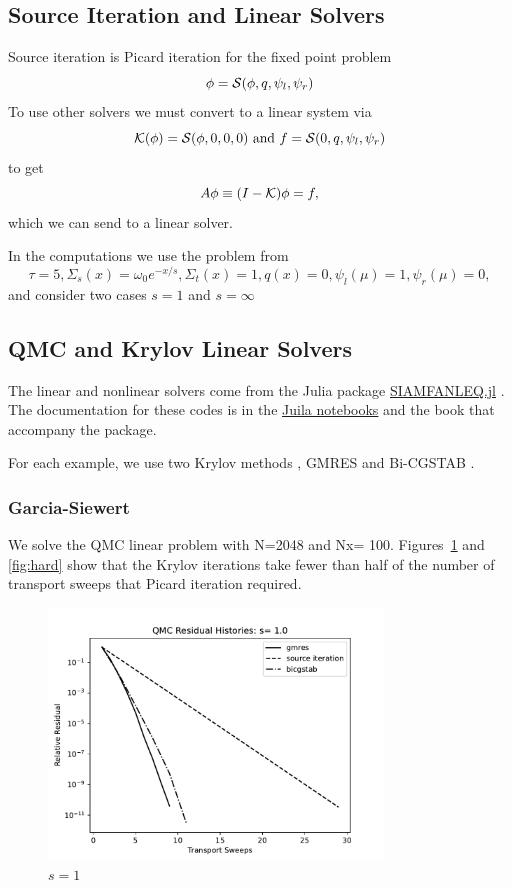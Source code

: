 \subsection{Source Iteration and Linear Solvers}
\label{subsec:source}

Source iteration is Picard iteration for the fixed point problem
\[
\phi = {\cal S}(\phi, q, \psi_l, \psi_r)
\]
To use other solvers we must convert to a linear system via
\[
{\cal K}(\phi) = {\cal S}(\phi, 0, 0, 0) \mbox{ and }
f = {\cal S}(0, q, \psi_l, \psi_r)
\]
to get
\[
A \phi \equiv (I - {\cal K}) \phi = f,
\]
which we can send to a linear solver.

In the computations we use the problem from \cite{cesinh}
\[
\tau=5, \Sigma_s(x) =\omega_0 e^{-x/s},  \Sigma_t(x) = 1, q(x) = 0, \psi_l(\mu) = 1, \psi_r(\mu) = 0,
\]
and consider two cases $s=1$ and $s=\infty$ 

\clearpage

\subsection{QMC and Krylov Linear Solvers}
\label{subsec:krylov}


The linear and nonlinear solvers come from the Julia package
\href{https://github.com/ctkelley/SIAMFANLEquations.jl}{SIAMFANLEQ.jl}
\cite{ctk:siamfanl}. The documentation for these codes is in the
\href{https://github.com/ctkelley/NotebookSIAMFANL}{Juila notebooks}
\cite{ctk:notebooknl} and the book \cite{ctk:fajulia}
that accompany the package. 

For each example,
we use two Krylov methods \cite{ctk:roots}, GMRES \cite{gmres} and
Bi-CGSTAB \cite{bicgstab}.  

\subsubsection{Garcia-Siewert}

We solve the QMC linear problem with N=2048 and Nx= 100. 
Figures~\ref{fig:easy} and 
\ref{fig:hard} show that
the Krylov iterations take fewer than half of the number
of transport sweeps that Picard iteration required.

\vspace*{.25in}

\begin{figure}[h]
\centerline{
\includegraphics[width=3.5in]{FIGURES/seqone.pdf}
}
\caption{\label{fig:easy} $s=1$}
\end{figure}


